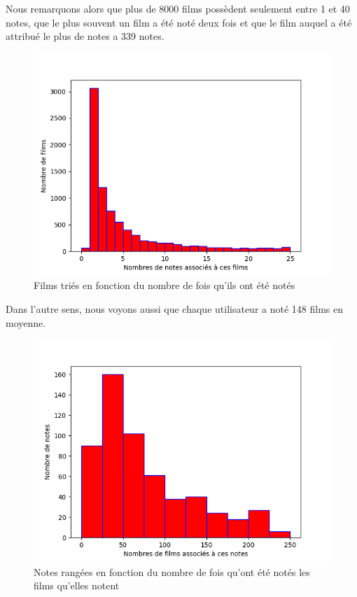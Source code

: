 \documentclass[a4paper,10pt]{article}
\begin{document}
Nous remarquons alors que plus de 8000 films possèdent seulement entre 1 et 40 notes, que le plus souvent un film a été noté deux fois et que le film auquel a été attribué le plus de notes a 339 notes.

\begin{figure}[H]
  \centering
\includegraphics[scale=0.5]{hist2.png}
\caption{Films triés en fonction du nombre de fois qu'ils ont été notés}
\end{figure}

Dans l’autre sens, nous voyons aussi que chaque utilisateur a noté 148 films en moyenne.

\begin{figure}[H]
  \centering
\includegraphics[scale=0.5]{hist1.png}
\caption{Notes rangées en fonction du nombre de fois qu'ont été notés les films qu'elles notent}
\end{figure}
\end{document}
